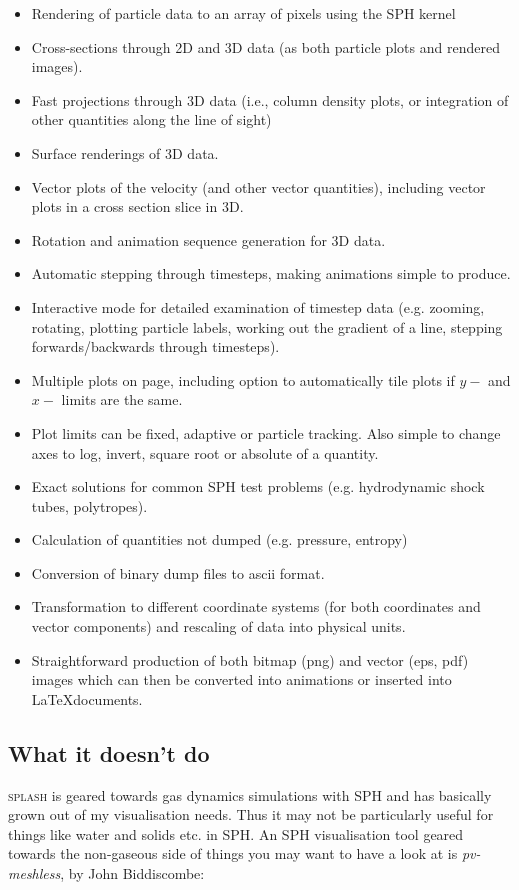 \documentclass[a4paper,10pt]{article}
\newcommand{\splash}{\textsc{splash }}
\begin{document}
\begin{itemize}
\item Rendering of particle data to an array of pixels using the SPH kernel
\item Cross-sections through 2D and 3D data (as both particle plots and rendered
images).
\item Fast projections through 3D data (i.e., column density plots, or integration of
other quantities along the line of sight)
\item Surface renderings of 3D data.
\item Vector plots of the velocity (and other vector quantities), including vector
plots in a cross section slice in 3D.
\item Rotation and animation sequence generation for 3D data.
\item Automatic stepping through timesteps, making animations simple to produce.
\item Interactive mode for detailed examination of timestep data (e.g. zooming,
rotating, plotting particle labels, working out the gradient of a line, stepping forwards/backwards
through timesteps).
\item Multiple plots on page, including option to automatically tile plots if $y-$ and $x-$ limits
are the same.
\item Plot limits can be fixed, adaptive or particle tracking. Also simple to change
axes to log, invert, square root or absolute of a quantity.
\item Exact solutions for common SPH test problems (e.g. hydrodynamic shock tubes,
polytropes).
\item Calculation of quantities not dumped (e.g. pressure, entropy)
\item Conversion of binary dump files to ascii format.
\item Transformation to different coordinate systems (for both coordinates and
vector components) and rescaling of data into physical units.
\item Straightforward production of both bitmap (png) and vector (eps, pdf) images which can then be
converted into animations or inserted into \LaTeX  documents.
\end{itemize}

\subsection{What it doesn't do}
 \splash is geared towards gas dynamics simulations with SPH and has basically grown out of my visualisation needs.
Thus it may not be particularly useful for things like water and solids etc. in SPH. An SPH visualisation tool geared towards the non-gaseous side of things you may want to have a look at is {\it pv-meshless}, by John Biddiscombe:
\end{document}
